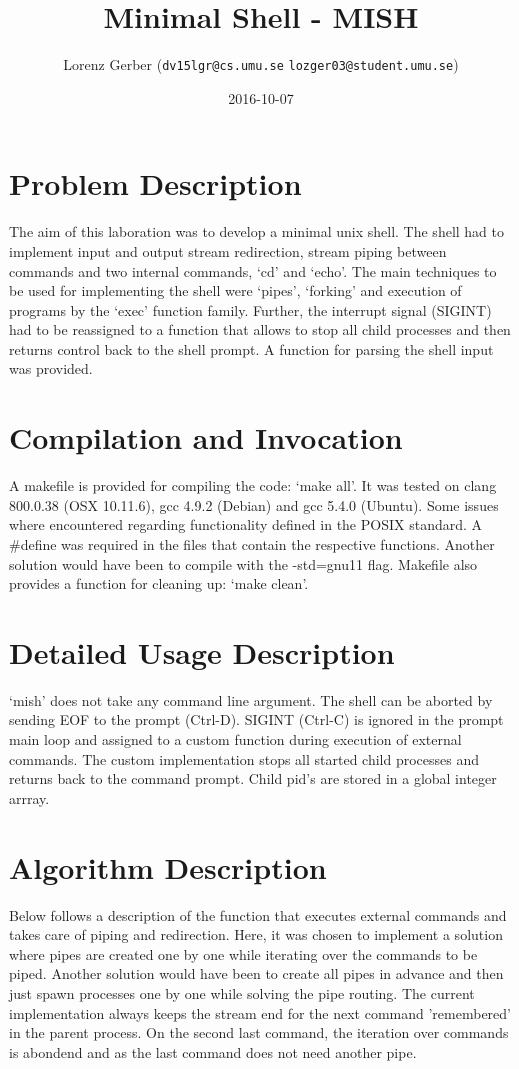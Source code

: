 \documentclass[a4paper,11pt,twoside]{article}
\title{Minimal Shell - MISH}
\author{Lorenz Gerber ({\tt{dv15lgr@cs.umu.se}} {\tt{lozger03@student.umu.se}})}
\date{2016-10-07}
\begin{document}
\lstset{language=C}
\maketitle
\thispagestyle{empty}
\newpage
\tableofcontents
\thispagestyle{empty}
\newpage

\clearpage
{}

\section{Problem Description} 
The aim of this laboration was to develop a minimal unix shell. The shell had to implement input and output stream redirection, stream piping between commands and two internal commands, `cd' and `echo'. The main techniques to be used for implementing the shell were `pipes', `forking' and execution of programs by the `exec' function family. Further, the interrupt signal (SIGINT) had to be reassigned to a function that allows to stop all child processes and then returns control back to the shell prompt. A function for parsing the shell input was provided. 

\section{Compilation and Invocation}
A makefile is provided for compiling the code: `make all'. It was tested on clang 800.0.38 (OSX 10.11.6), gcc 4.9.2 (Debian) and gcc 5.4.0 (Ubuntu). Some issues where encountered regarding functionality defined in the POSIX standard. A \#define was required in the files that contain the respective functions. Another solution would have been to compile with the -std=gnu11 flag. Makefile also provides a function for cleaning up: `make clean'.

\section{Detailed Usage Description}
`mish' does not take any command line argument. The shell can be aborted by sending EOF to the prompt (Ctrl-D). SIGINT (Ctrl-C) is ignored in the prompt main loop and assigned to a custom function during execution of external commands. The custom implementation stops all started child processes and returns back to the command prompt. Child pid's are stored in a global integer arrray. 

\section{Algorithm Description}
Below follows a description of the function that executes external commands and takes care of piping and redirection. Here, it was chosen to implement a solution where pipes are created one by one while iterating over the commands to be piped. Another solution would have been to create all pipes in advance and then just spawn processes one by one while solving the pipe routing. The current implementation always keeps the stream end for the next command 'remembered' in the parent process. On the second last command, the iteration over commands is abondend and as the last command does not need another pipe. 
\end{document}
